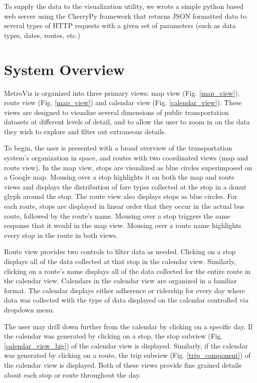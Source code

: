 \documentclass[journal]{vgtc}
\begin{document}
To supply the data to the visualization utility, we wrote a simple python based web server using the CherryPy framework that returns JSON formatted data to several types of HTTP requests with a given set of parameters (such as data types, dates, routes, etc.)

\section{System Overview}
MetroViz is organized into three primary views: map view (Fig. \ref{map_view}), route view (Fig. \ref{map_view}) and calendar view (Fig. \ref{calendar_view}). These views are designed to visualize several dimensions of public transportation datasets at different levels of detail, and to allow the user to zoom in on the data they wish to explore and filter out extraneous details.

To begin, the user is presented with a broad overview of the transportation system's organization in space, and routes with two coordinated views (map and route view). In the map view, stops are visualized as blue circles superimposed on a Google map. Mousing over a stop highlights it on both the map and route views and displays the distribution of fare types collected at the stop in a donut glyph around the stop. The route view also displays stops as blue circles. For each route, stops are displayed in linear order that they occur in the actual bus route, followed by the route's name. Mousing over a stop triggers the same response that it would in the map view. Mousing over a route name highlights every stop in the route in both views.

Route view provides two controls to filter data as needed. Clicking on a stop displays all of the data collected at that stop in the calendar view. Similarly, clicking on a route's name displays all of the data collected for the entire route in the calendar view. Calendars in the calendar view are organized in a familiar format. The calendar displays either adherence or ridership for every day where data was collected with the type of data displayed on the calendar controlled via dropdown menu.

The user may drill down further from the calendar by clicking on a specific day. If the calendar was generated by clicking on a stop, the stop subview (Fig. \ref{calendar_view_big}) of the calendar view is displayed. Similarly, if the calendar was generated by clicking on a route, the trip subview (Fig. \ref{trip_component}) of the calendar view is displayed. Both of these views provide fine grained details about each stop or route throughout the day.
\end{document}
